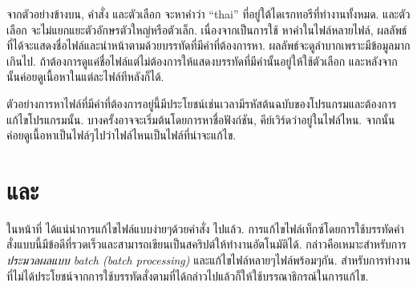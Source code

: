 \begin{thwbr}
จากตัวอย่างข้างบน, คำสั่ง  และตัวเลือก  จะหาคำว่า ``thai'' ที่อยู่ใต้ไดเรกทอรีที่ทำงานทั้งหมด. และตัวเลือก  จะไม่แยกแยะตัวอักษรตัวใหญ่หรือตัวเล็ก. เนื่องจากเป็นการใช้  หาคำในไฟล์หลายไฟล์, ผลลัพธ์ที่ได้จะแสดงชื่อไฟล์และนำหน้าตามด้วยบรรทัดที่มีคำที่ต้องการหา. ผลลัพธ์จะดูลำบากเพราะมีข้อมูลมากเกินไป. ถ้าต้องการดูแค่ชื่อไฟล์แต่ไม่ต้องการให้แสดงบรรทัดที่มีคำนั้นอยู่ให้ใช้ตัวเลือก  และหลังจากนั้นค่อยดูเนื้อหาในแต่ละไฟล์ทีหลังก็ได้.
\begin{MyExample}
\end{MyExample}%

ตัวอย่างการหาไฟล์ที่มีคำที่ต้องการอยู่นี้มีประโยชน์เช่นเวลามีรหัสต้นฉบับของโปรแกรมและต้องการแก้ไขโปรแกรมนั้น. บางครั้งอาจจะเริ่มต้นโดยการหาชื่อฟังก์ชัน, คีย์เวิร์ดว่าอยู่ในไฟล์ไหน. จากนั้นค่อยดูเนื้อหาเป็นไฟล์ๆไปว่าไฟล์ไหนเป็นไฟล์ที่น่าจะแก้ไข.












\section{ และ }
ในหน้าที่ \pageref{sec:tr} ได้แน่นำการแก้ไขไฟล์แบบง่ายๆด้วยคำสั่ง  ไปแล้ว. การแก้ไขไฟล์เท็กซ์โดยการใช้บรรทัดคำสั่งแบบนี้มีข้อดีที่รวดเร็วและสามารถเขียนเป็นสคริปต์ให้ทำงานอัตโนมัติได้. กล่าวคือเหมาะสำหรับการ\emph{ประมวลผลแบบ batch (batch processing)} และแก้ไขไฟล์หลายๆไฟล์พร้อมๆกัน. สำหรับการทำงานที่ไม่ได้ประโยชน์จากการใช้บรรทัดสั่งตามที่ได้กล่าวไปแล้วก็ให้ใช้บรรณาธิกรณ์ในการแก้ไข.


\end{thwbr}
